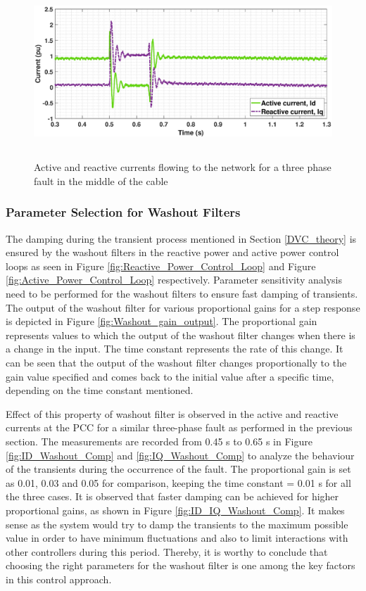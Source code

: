 \begin{figure}[H]
    \includegraphics[height = 6.5cm,width = \textwidth]{Diagrams/Chapter_3/ID_IQ_Final_4.eps}
    \caption{Active and reactive currents flowing to the network for a three phase fault in the middle of the cable}
    \label{fig:ID_IQ_Final_3}
\end{figure}


\subsubsection{Parameter Selection for Washout Filters}\label{para_selection_washout}
The damping during the transient process mentioned in Section \ref{DVC_theory} is ensured by the washout filters in the reactive power and active power control loops as seen in Figure \ref{fig:Reactive_Power_Control_Loop} and Figure \ref{fig:Active_Power_Control_Loop} respectively. Parameter sensitivity analysis need to be performed for the washout filters to ensure fast damping of transients. The output of the washout filter for various proportional gains for a step response is depicted in Figure \ref{fig:Washout_gain_output}. The proportional gain represents values to which the output of the washout filter changes when there is a change in the input. The time constant represents the rate of this change. It can be seen that the output of the washout filter changes proportionally to the gain value specified and comes back to the initial value after a specific time, depending on the time constant mentioned.


Effect of this property of washout filter is observed in the active and reactive currents at the \gls{PCC} for a similar three-phase fault as performed in the previous section. The measurements are recorded from 0.45 s to 0.65 s in Figure \ref{fig:ID_Washout_Comp} and \ref{fig:IQ_Washout_Comp} to analyze the behaviour of the transients during the occurrence of the fault. The proportional gain is set as 0.01, 0.03 and 0.05 for comparison, keeping the time constant = 0.01 s for all the three cases. It is observed that faster damping can be achieved for higher proportional gains, as shown in Figure \ref{fig:ID_IQ_Washout_Comp}. It makes sense as the system would try to damp the transients to the maximum possible value in order to have minimum fluctuations and also to limit interactions with other controllers during this period. Thereby, it is worthy to conclude that choosing the right parameters for the washout filter is one among the key factors in this control approach.

